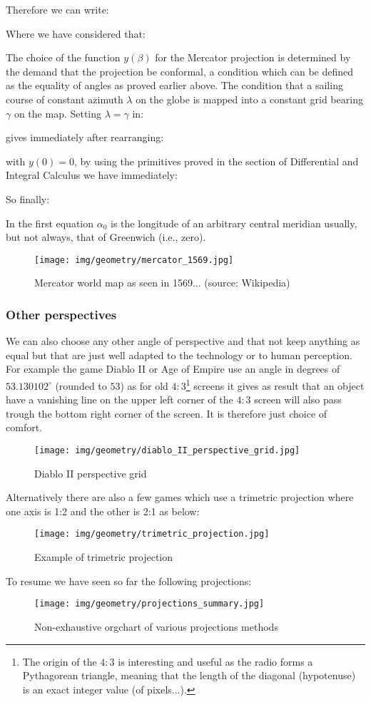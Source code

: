	Therefore we can write:
	
	Where we have considered that:
	
	The choice of the function $y(\beta)$ for the Mercator projection is determined by the demand that the projection be conformal, a condition which can be defined as the equality of angles as proved earlier above. The condition that a sailing course of constant azimuth $\lambda$ on the globe is mapped into a constant grid bearing $\gamma$ on the map. Setting $\lambda = \gamma$ in:
	
 	gives immediately after rearranging:
	
	with $y(0) = 0$, by using the primitives proved in the section of Differential and Integral Calculus we have immediately:
	
	So finally:
	
	In the first equation $\alpha_0$ is the longitude of an arbitrary central meridian usually, but not always, that of Greenwich (i.e., zero).
	
	\begin{figure}[H]
		\centering
		\texttt{[image: img/geometry/mercator\_1569.jpg]}
		\caption[Mercator world map as seen in 1569]{Mercator world map as seen in 1569... (source: Wikipedia)}
	\end{figure}
	
	\subsubsection{Other perspectives}
	We can also choose any other angle of perspective and that not keep anything as equal but that are just well adapted to the technology or to human perception. For example the game Diablo II or Age of Empire use an angle in degrees of $53.130102^\circ$ (rounded to $53$) as for old $4:3$\footnote{The origin of the $4:3$ is interesting and useful as the radio forms a Pythagorean triangle, meaning that the length of the diagonal (hypotenuse) is an exact integer value (of pixels...).} screens it gives as result that an object have a vanishing line on the upper left corner of the $4:3$ screen will also pass trough the bottom right corner of the screen. It is therefore just choice of comfort.
	\begin{figure}[H]
		\centering
		\texttt{[image: img/geometry/diablo\_II\_perspective\_grid.jpg]}
		\caption[]{Diablo II perspective grid}
	\end{figure}
	Alternatively there are also a few games which use a trimetric projection where one axis is 1:2 and the other is 2:1 as below:
	\begin{figure}[H]
		\centering
		\texttt{[image: img/geometry/trimetric\_projection.jpg]}
		\caption[]{Example of trimetric projection}
	\end{figure}
	To resume we have seen so far the following projections:
	\begin{figure}[H]
		\centering
		\texttt{[image: img/geometry/projections\_summary.jpg]}
		\caption{Non-exhaustive orgchart of various projections methods}
	\end{figure}
	
